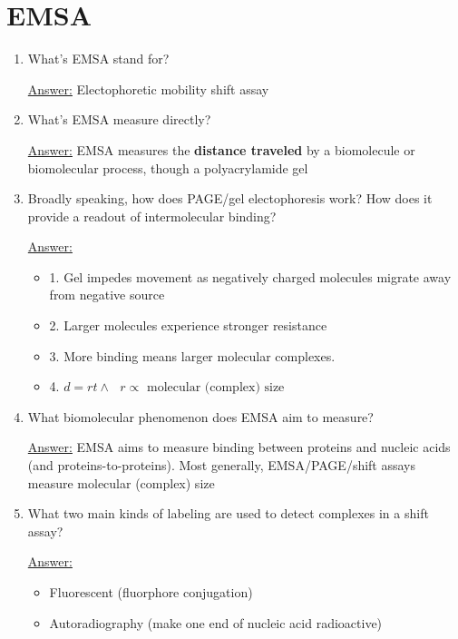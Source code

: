 \documentclass{article}
\newenvironment{QandA}{\begin{enumerate}[label=\bfseries Q\arabic*.]}
                       {\end{enumerate}}
\newenvironment{answered}{\par\normalfont\underline{Answer:}}{}
\begin{document}
\section{EMSA}
\begin{QandA}
  \item{What's EMSA stand for?}
    \begin{answered}
    Electophoretic mobility shift assay
    \end{answered}
  \item{What's EMSA measure directly?}
    \begin{answered}
    EMSA measures the \textbf{distance traveled} by a biomolecule or biomolecular process, though a polyacrylamide gel
    \end{answered}
  \item{Broadly speaking, how does PAGE/gel electophoresis work? How does it provide a readout of intermolecular binding?}
    \begin{answered}
    \begin{itemize}
      \item{1. Gel impedes movement as negatively charged molecules migrate away from negative source}
      \item{2. Larger molecules experience stronger resistance}
      \item{3. More binding means larger molecular complexes.}
      \item{4. $d = rt \land \text{ } r \propto \text{ molecular (complex) size}$}
    \end{itemize}
    \end{answered}
  \item{What biomolecular phenomenon does EMSA aim to measure?}
    \begin{answered}
    EMSA aims to measure binding between proteins and nucleic acids (and proteins-to-proteins). Most generally, EMSA/PAGE/shift assays measure molecular (complex) size
    \end{answered}
  \item{What two main kinds of labeling are used to detect complexes in a shift assay?}
    \begin{answered}
    \begin{itemize}
      \item{Fluorescent (fluorphore conjugation)}
      \item{Autoradiography (make one end of nucleic acid radioactive)}
    \end{itemize}
    \end{answered}

\end{QandA}
\end{document}
